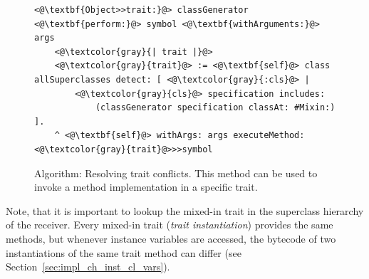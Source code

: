 \begin{figure}[!htp]
\begin{lstlisting}
<@\textbf{Object>>trait:}@> classGenerator <@\textbf{perform:}@> symbol <@\textbf{withArguments:}@> args
    <@\textcolor{gray}{| trait |}@>
    <@\textcolor{gray}{trait}@> := <@\textbf{self}@> class allSuperclasses detect: [ <@\textcolor{gray}{:cls}@> |
        <@\textcolor{gray}{cls}@> specification includes: 
            (classGenerator specification classAt: #Mixin:) ].
    ^ <@\textbf{self}@> withArgs: args executeMethod: <@\textcolor{gray}{trait}@>>>symbol
\end{lstlisting}
\caption[Algorithm: Resolving trait conflicts]{Algorithm: Resolving trait conflicts. This method can be used to invoke a method implementation in a specific trait.}
\label{fig:algo_trait_res}
\end{figure}

Note, that it is important to lookup the mixed-in trait in the superclass hierarchy of the receiver. Every mixed-in trait (\emph{trait instantiation}) provides the same methods, but whenever instance variables are accessed, the bytecode of two instantiations of the same trait method can differ (see Section~\ref{sec:impl_ch_inst_cl_vars}).

